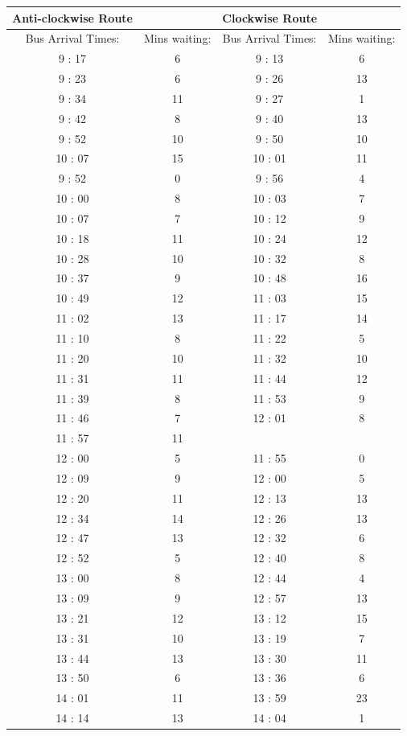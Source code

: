 {\begin{table}[tph]
\end{table}
\begin{table}[tph]
\centering

\begin{tabular}{|cc|cc|}\hline
\bf{Anti-clockwise Route}		&		&\bf{Clockwise Route}			&		\\	\hline
Bus Arrival Times:			&	Mins waiting:	&	Bus Arrival Times:			&	Mins waiting:	\\	\hline
9	:	17	&	6	&	9	:	13	&	6	\\	
9	:	23	&	6	&	9	:	26	&	13	\\	
9	:	34	&	11	&	9	:	27	&	1	\\	
9	:	42	&	8	&	9	:	40	&	13	\\	
9	:	52	&	10	&	9	:	50	&	10	\\	
10	:	07	&	15	&	10	:	01	&	11	\\\hline
9	:	52	&	0	&	9	:	56	&	4	\\	
10	:	00	&	8	&	10	:	03	&	7	\\	
10	:	07	&	7	&	10	:	12	&	9	\\	
10	:	18	&	11	&	10	:	24	&	12	\\	
10	:	28	&	10	&	10	:	32	&	8	\\	
10	:	37	&	9	&	10	:	48	&	16	\\	
10	:	49	&	12	&	11	:	03	&	15	\\	
11	:	02	&	13	&	11	:	17	&	14	\\	
11	:	10	&	8	&	11	:	22	&	5	\\	
11	:	20	&	10	&	11	:	32	&	10	\\	
11	:	31	&	11	&	11	:	44	&	12	\\	
11	:	39	&	8	&	11	:	53	&	9	\\	
11	:	46	&	7	&	12	:	01	&	8	\\	
11	:	57	&	11	&				&		\\	\hline
12	:	00	&	5	&	11	:	55	&	0	\\	
12	:	09	&	9	&	12	:	00	&	5	\\	
12	:	20	&	11	&	12	:	13	&	13	\\	
12	:	34	&	14	&	12	:	26	&	13	\\	
12	:	47	&	13	&	12	:	32	&	6	\\	
12	:	52	&	5	&	12	:	40	&	8	\\	
13	:	00	&	8	&	12	:	44	&	4	\\	
13	:	09	&	9	&	12	:	57	&	13	\\	
13	:	21	&	12	&	13	:	12	&	15	\\	
13	:	31	&	10	&	13	:	19	&	7	\\	
13	:	44	&	13	&	13	:	30	&	11	\\	
13	:	50	&	6	&	13	:	36	&	6	\\	
14	:	01	&	11	&	13	:	59	&	23	\\	
14	:	14	&	13	&	14	:	04	&	1	\\	\hline
\end{tabular}
\end{table}
}
\newpage
